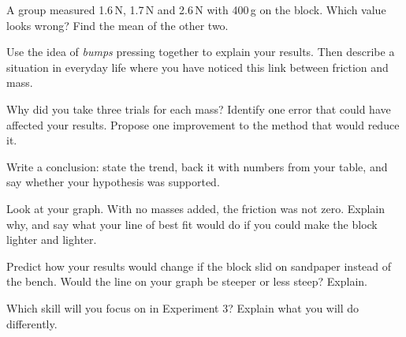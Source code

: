 \task A group measured 1.6\,N, 1.7\,N and 2.6\,N with 400\,g on the block. Which value looks wrong? Find the mean of the other two.

\task Use the idea of \emph{bumps} pressing together to explain your results. Then describe a situation in everyday life where you have noticed this link between friction and mass.

\task {}
Why did you take three trials for each mass?
Identify one error that could have affected your results.
Propose one improvement to the method that would reduce it.

\task Write a conclusion: state the trend, back it with numbers from your table, and say whether your hypothesis was supported.


\begin{yr8box}
\begin{keepext}
\exttask Look at your graph. With no masses added, the friction was not zero. Explain why, and say what your line of best fit would do if you could make the block lighter and lighter.
\end{keepext}
\begin{keepext}
\exttask Predict how your results would change if the block slid on sandpaper instead of the bench. Would the line on your graph be steeper or less steep? Explain.
\end{keepext}
\end{yr8box}


\begin{skillcheck}
\end{skillcheck}

\task Which skill will you focus on in Experiment 3? Explain what you will do differently.
